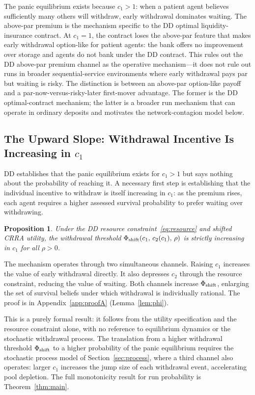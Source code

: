 \documentclass[12pt]{article}\usepackage[]{graphicx}\usepackage[]{xcolor}
\newtheorem{proposition}{Proposition}
\begin{document}
The panic equilibrium exists because $c_1 > 1$: when a patient agent believes sufficiently many others will withdraw, early withdrawal dominates waiting.
The above-par premium is the mechanism specific to the DD optimal liquidity-insurance contract.
At $c_1 = 1$, the contract loses the above-par feature that makes early withdrawal option-like for patient agents: the bank offers no improvement over storage and agents do not bank under the DD contract.
This rules out the DD above-par premium channel as the operative mechanism---it does not rule out runs in broader sequential-service environments where early withdrawal pays par but waiting is risky.
The distinction is between an above-par option-like payoff and a par-now-versus-risky-later first-mover advantage.
The former is the DD optimal-contract mechanism; the latter is a broader run mechanism that can operate in ordinary deposits and motivates the network-contagion model below.

\subsection{The Upward Slope: Withdrawal Incentive Is Increasing in $c_1$}

DD establishes that the panic equilibrium exists for $c_1 > 1$ but says nothing about the probability of reaching it.
A necessary first step is establishing that the individual incentive to withdraw is itself increasing in $c_1$: as the premium rises, each agent requires a higher assessed survival probability to prefer waiting over withdrawing.

\begin{proposition}
\label{prop:upslope}
Under the DD resource constraint~\eqref{eq:resource} and shifted CRRA utility, the withdrawal threshold $\Phi_{\rm shift}(c_1,\,c_2(c_1),\,\rho)$ is strictly increasing in $c_1$ for all $\rho > 0$.
\end{proposition}

The mechanism operates through two simultaneous channels.
Raising $c_1$ increases the value of early withdrawal directly.
It also depresses $c_2$ through the resource constraint, reducing the value of waiting.
Both channels increase $\Phi_{\rm shift}$, enlarging the set of survival beliefs under which withdrawal is individually rational.
The proof is in Appendix~\ref{app:proofA} (Lemma~\ref{lem:phi}).

This is a purely formal result: it follows from the utility specification and the resource constraint alone, with no reference to equilibrium dynamics or the stochastic withdrawal process.
The translation from a higher withdrawal threshold $\Phi_{\rm shift}$ to a higher probability of the panic equilibrium requires the stochastic process model of Section~\ref{sec:process}, where a third channel also operates: larger $c_1$ increases the jump size of each withdrawal event, accelerating pool depletion.
The full monotonicity result for run probability is Theorem~\ref{thm:main}.
\end{document}
